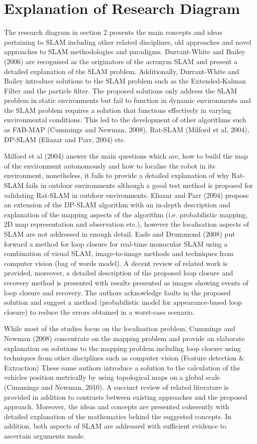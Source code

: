 \documentclass[a4paper, 12pt]{article}
\begin{document}
\newpage 
\section{ Explanation of Research Diagram }
The research diagram in section 2 presents the main concepts and ideas pertaining to SLAM including other related disciplines, old approaches and novel approaches to SLAM methodologies and paradigms. Durrant-White and Bailey (2006) are recognised as the originators of the acronym SLAM and present a detailed explanation of the SLAM problem. Additionally, Durrant-White and Bailey introduce solutions to the SLAM problem such as the Extended-Kalman Filter and the particle filter. The proposed solutions only address the SLAM problem in static environments but fail to function in dynamic environments and the SLAM problem requires a solution that functions effectively in varying environmental conditions. This led to the development of other algorithms such as FAB-MAP (Cummings and Newman, 2008), Rat-SLAM (Milford et al, 2004), DP-SLAM (Eliazar and Parr, 2004) etc.

Milford et al (2004) answer the main questions which are, how to build the map of the environment autonomously and how to localise the robot in its environment, nonetheless, it fails to provide a detailed explanation of why Rat-SLAM fails in outdoor environments although a good test method is proposed for validating Rat-SLAM in outdoor environments. Eliazar and Parr (2004) propose an extension of the DP-SLAM algorithm with an in-depth description and explanation of the mapping aspects of the algorithm (i.e. probabilistic mapping, 2D map representation and observation etc.), however the localisation aspects of SLAM are not addressed in enough detail. Eade and Drummond (2008) put forward a method for loop closure for real-time monocular SLAM using a combination of visual SLAM, image-to-image methods and techniques from computer vision (bag of words model). A decent review of related work is provided, moreover, a detailed description of the proposed loop closure and recovery method is presented with results presented as images showing events of loop closure and recovery. The authors acknowledge faults in the proposed solution and suggest a method (probabilistic model for appearance-based loop closure) to reduce the errors obtained in a worst-case scenario.
 
While most of the studies focus on the localisation problem, Cummings and Newman (2008) concentrate on the mapping problem and provide an elaborate explanation on solutions to the mapping problem including loop closure using techniques from other disciplines such as computer vision (Feature detection \& Extraction) These same authors introduce a solution to the calculation of the vehicles position metrically by using topological maps on a global scale (Cummings and Newman, 2010). A succinct review of related literature is provided in addition to contrasts between existing approaches and the proposed approach. Moreover, the ideas and concepts are presented coherently with detailed explanation of the mathematics behind the suggested concepts. In addition, both aspects of SLAM are addressed with sufficient evidence to ascertain arguments made.
 
\end{document}
